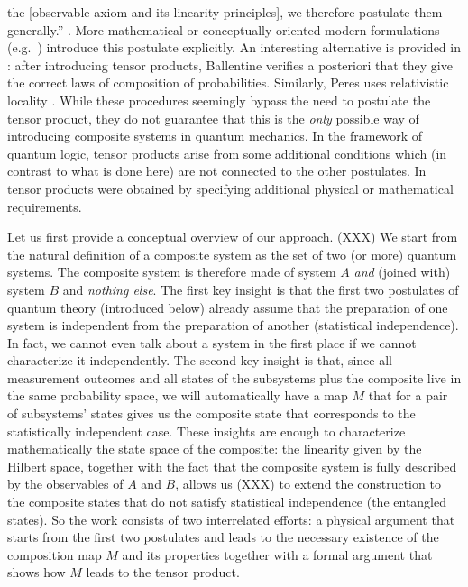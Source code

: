 \documentclass[aps,prl,amsmath,amssymb,twocolumn]{revtex4}
\theoremstyle{plain}
\theoremstyle{definition}
\theoremstyle{remark}
\def\comment#1{}
\begin{document}
the [observable axiom and its linearity principles], we therefore
postulate them generally.''  \cite{vonneumannbook}.  More mathematical
or conceptually-oriented modern formulations
(e.g.~\cite{ozawa,masanes,wootters,nielsenchuang}) introduce this
postulate explicitly.  An interesting alternative is provided in
\cite{ballentinebook,ballentinepaper}: after introducing tensor
products, Ballentine verifies a posteriori that they give the correct
laws of composition of probabilities. Similarly, Peres uses
relativistic locality \cite{peres}. While these procedures seemingly
bypass the need to postulate the tensor product, they do not guarantee
that this is the {\em only} possible way of introducing composite
systems in quantum mechanics. In the framework of quantum logic,
tensor products arise from some additional conditions \cite{matolcsi}
which (in contrast to what is done here) are not connected to the
other postulates.  In \cite{marmo,aerts} tensor products were obtained
by specifying additional physical or mathematical requirements.
\comment{ {\em Il resto della frase da spostare in supp material} In
  quantum field theory one tends to avoid problems connected with
  tensor products of infinite dimensional spaces by focusing on
  algebraic commutation structures, e.g.~\cite{giddins,roos}.  In
  particular, the recent MIP*=RE result \cite{mipre} implies that, in
  infinite dimensions, the tensor product is strictly less
  computationally powerful than the commutation structures,
  emphasizing the difference among these two structures, at least for
  the infinite-dimensional case. We will consider the non-relativistic
  setting here.}
	
Let us first provide a conceptual overview of our approach. (XXX) We start from the natural definition of a composite system as the set
of two (or more) quantum systems. The composite system is therefore
made of system $A$ {\em and} (joined with) system $B$ and {\em nothing
  else}. The first key insight is that the first two postulates of
quantum theory (introduced below) already assume that the preparation
of one system is independent from the preparation of another
(statistical independence). In fact, we cannot even talk about a
system in the first place if we cannot characterize it independently.
The second key insight is that, since all measurement outcomes and all
states of the subsystems plus the composite live in the same
probability space, we will automatically have a map $M$ that for a
pair of subsystems' states gives us the composite state that
corresponds to the statistically independent case. These insights are
enough to characterize mathematically the state space of the
composite: the linearity given by the Hilbert space, together with the
fact that the composite system is fully described by the observables
of $A$ and $B$, allows us (XXX) to extend the construction to the composite
states that do not satisfy statistical independence (the entangled
states). So the work consists of two interrelated efforts: a physical
argument that starts from the first two postulates and leads to the
necessary existence of the composition map $M$ and its properties
together with a formal argument that shows how $M$ leads to the tensor
product.
	
\end{document}
